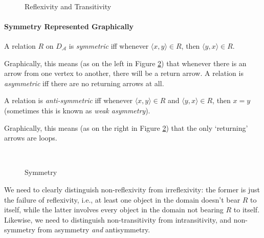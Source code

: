 \begin{figure}
\begin{center}
	{~\qquad\qquad}{}
\end{center}	\caption{Reflexivity and Transitivity\label{fone}}
\end{figure}


\paragraph{Symmetry Represented Graphically}

\begin{definition}[Symmetric]
	A relation $R$ on $D_{\mathscr{A}}$ is \emph{symmetric} iff whenever $\langle x,y\rangle \in R$, then $\langle y,x\rangle \in R$.
\end{definition} Graphically, this means (as on the left in Figure \ref{ftwo}) that whenever there is an arrow from one vertex to another, there will be a return arrow. A relation is \emph{asymmetric} iff there are no returning arrows at all.

\begin{definition}
	A relation is \emph{anti-symmetric} iff whenever $\langle x,y\rangle \in R$ and $\langle y,x\rangle \in R$, then $x=y$ (sometimes this is known as \emph{weak asymmetry}).
\end{definition} Graphically, this means (as on the right in Figure \ref{ftwo}) that the only `returning' arrows are loops.

\begin{figure}
\begin{center}
	~{\qquad\qquad}{}
\end{center}	\caption{Symmetry\label{ftwo}}
\end{figure}

We need to clearly distinguish non-reflexivity from irreflexivity: the former is just the failure of reflexivity, i.e., at least one object in the domain doesn't bear $R$ to itself, while the latter involves every object in the domain not bearing $R$ to itself. Likewise, we need to distinguish non-transitivity from intransitivity, and non-symmetry from asymmetry \emph{and} antisymmetry. 

